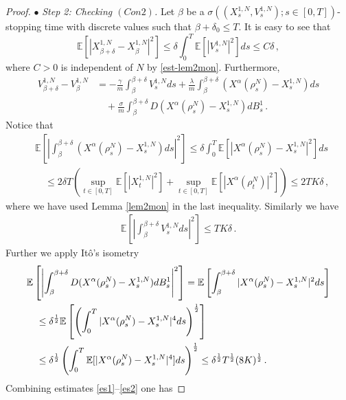 \documentclass{ims9x6}
\newcommand{\nn}{\nonumber}
\newcommand{\EE}{\mathbb{E}}
\begin{document}
\begin{proof}
	$\bullet$ \textit{Step 2: Checking $(Con 2)$. }   Let $\beta$ be a $\sigma((X_s^{1,N},V_s^{1,N});s\in[0,T])$-stopping time with discrete values such that $\beta+\delta_0\leq T$.  It is easy to see that
	\begin{equation}
		\EE [|X_{\beta+\delta}^{1,N}-X_{\beta}^{1,N}|^2]\leq \delta\int_0^{T} \EE[|V_s^{1,N}|^2]ds\leq C\delta\,,
	\end{equation}
	where $C>0$ is independent of $N$ by \eqref{est-lem2mon}. Furthermore, 
	\begin{align*}
		V_{\beta+\delta}^{1,N}-V_{\beta}^{1,N}&=-\frac{\gamma}{m}\int_\beta^{\beta+\delta}V_{s}^{1,N}ds+\frac{\lambda}{m}\int_{\beta}^{\beta+\delta }(X^\alpha(\rho_s^N)-X_s^{1,N})ds\nn\\
		&\quad+\frac{\sigma}{m}\int_{\beta}^{\beta+\delta}D(X^\alpha(\rho_s^N)-X_s^{1,N})dB_s^1\,.
	\end{align*}
	Notice that
	\begin{equation}
	\label{es1}
	\begin{split}
		&\EE\left[\left|\int_{\beta}^{\beta+\delta }(X^\alpha(\rho_s^N)-X_s^{1,N})ds\right|^2\right]\leq \delta \int_0^T\EE\left[|X^\alpha(\rho_s^N)-X_s^{1,N}|^2\right]ds\\
		&\quad \leq  2 \delta T \left(\sup\limits_{t\in[0,T]}\EE\left[|X_t^{1,N}|^2\right] +\sup\limits_{t\in[0,T]}\EE\left[|X^\alpha(\rho^N_t)|^2\right]\right)\leq 2TK\delta\,,
	\end{split}
	\end{equation}
	where we have used Lemma \ref{lem2mon} in the last inequality.  Similarly we have
	\begin{align}\label{es1'}
	\EE\left[\left|\int_{\beta}^{\beta+\delta } V_s^{1,N}ds\right|^2\right] \leq TK\delta\,.
	\end{align}
	Further we apply It\^{o}'s isometry 
	\begin{align}\label{es2}
		&\EE\left[\left|\int_{\beta}^{\beta+\delta}D (X^\alpha(\rho_s^N)-X_s^{1,N})dB_s^1\right|^2\right]
		= \EE\left[\int_{\beta}^{\beta+\delta}|X^\alpha(\rho_s^N)-X_s^{1,N}|^2ds\right]
		\notag\\
		&\quad\leq
		 \delta^{\frac{1}{2}}  \EE \left[\left(\int_{0}^{T}|X^\alpha(\rho_s^N)-X_s^{1,N}|^4ds\right)^{\frac{1}{2}}\right]\nn\\
		&\quad \leq   \delta^{\frac{1}{2}}
		\left(\int_0^T\EE[|X^\alpha(\rho_s^N)-X_s^{1,N}|^4] ds\right)^\frac{1}{2}
	\leq
		 \delta^{\frac{1}{2}} T^{\frac{1}{2}}(8K)^{\frac{1}{2}}\,.
	\end{align} 
	Combining estimates \eqref{es1}--\eqref{es2} one has

\end{proof}
\end{document}

